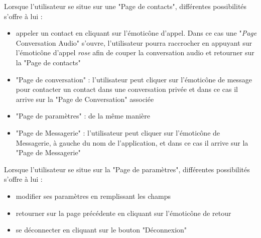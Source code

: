 	\newpage

	Lorsque l'utilisateur se situe sur une "Page de contacts", différentes possibilités s'offre à lui :
	\begin{itemize}
		\item appeler un contact en cliquant sur l’émoticône d'appel.
		Dans ce cas une "\textit{Page} Conversation Audio" s'ouvre, l'utilisateur pourra raccrocher en appuyant sur l’émoticône d'appel \textit{rose} afin de couper la conversation audio et retourner sur la "Page de contacts"
		\item "Page de conversation" : l'utilisateur peut cliquer sur l’émoticône de message pour contacter un contact dans une conversation privée et dans ce cas il arrive sur la "Page de Conversation" associée
		\item "Page de paramètres" : de la même manière
		\item "Page de Messagerie" : l'utilisateur peut cliquer sur l’émoticône de Messagerie, à gauche du nom de l'application, et dans ce cas il arrive sur la "Page de Messagerie"\\
	\end{itemize}

	Lorsque l'utilisateur se situe sur la "Page de paramètres", différentes possibilités s'offre à lui :
	\begin{itemize}
		\item modifier ses paramètres en remplissant les champs
		\item retourner sur la page précédente en cliquant sur l’émoticône de retour
		\item se déconnecter en cliquant sur le bouton "Déconnexion"\\
	\end{itemize}

